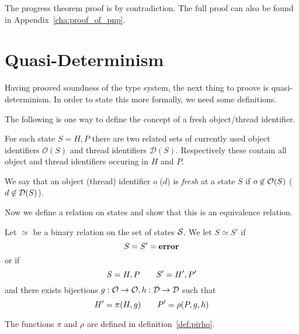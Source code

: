 The progress theorem proof is by contradiction. The full proof can also be found in
Appendix~\ref{cha:proof_of_pnp}.

\section{Quasi-Determinism}%
\label{sec:quasi_determinism}

Having prooved soundness of the type system, the next thing to proove is
quasi-determinism. In order to state this more formally, we need some
definitions.

The following is one way to define the concept of a fresh object\slash thread
identifier.
\begin{definition}
  For each state $S = H, P$ there are two related sets of currently used object
  identifiers $\mathcal{O}(S)$ and thread identifiers $\mathcal{D}(S)$.
  Respectively these contain all object and thread identifiers occuring in $H$
  and $P$. 
\end{definition}

\begin{definition}
  We say that an object (thread) identifier $o$ ($d$) is \emph{fresh} at a state $S$ if
  $o \not\in \mathcal{O}(S)$ ($d \not\in \mathcal{D}(S)$).
\end{definition}

Now we define a relation on states and show that this is an equivalence
relation.
\begin{definition} \label{def:eqrel}
  Let $\simeq$ be a binary relation on the set of states $\mathcal{S}$.
  We let $S \simeq S'$ if
  \begin{equation*}
    S = S' = \mbox{{\bf error}}
  \end{equation*}
  or if
  \begin{equation}
    S = H, P \quad\quad S' = H', P'
  \end{equation}
  and there exists bijections $g: \mathcal{O} \to \mathcal{O}, h: \mathcal{D} \to \mathcal{D}$
  such that
  \begin{equation}
    H' = \pi(H, g) \quad\quad P' = \rho(P, g, h)
  \end{equation}
  
  The functions $\pi$ and $\rho$ are defined in definition~\ref{def:pirho}.
\end{definition}


